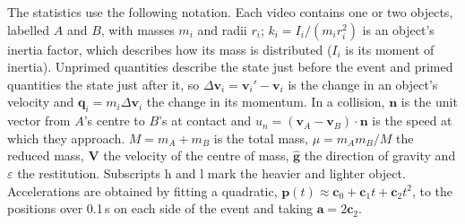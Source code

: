 \documentclass[10pt]{article}
\newcommand{\eps}{\varepsilon}
\newcommand{\ghat}{\hat{\mathbf g}}
\begin{document}
The statistics use the following notation. Each video contains one or two objects, labelled $A$ and $B$, with masses
$m_i$ and radii $r_i$; $k_i=I_i/(m_ir_i^2)$ is an object's inertia factor, which describes how its mass is distributed
($I_i$ is its moment of inertia). Unprimed quantities describe the state just before the event and primed quantities
the state just after it, so $\Delta\mathbf v_i=\mathbf v_i'-\mathbf v_i$ is the change in an object's velocity and
$\mathbf q_i=m_i\Delta\mathbf v_i$ the change in its momentum. In a collision, $\mathbf n$ is the unit vector from
$A$'s centre to $B$'s at contact and $u_n=(\mathbf v_A-\mathbf v_B)\cdot\mathbf n$ is the speed at which they
approach. $M=m_A+m_B$ is the total mass, $\mu=m_Am_B/M$ the reduced mass, $\mathbf V$ the velocity of the centre of
mass, $\ghat$ the direction of gravity and $\eps$ the restitution. Subscripts h and l mark the heavier and lighter
object. Accelerations are obtained by fitting a quadratic, $\mathbf p(t)\approx\mathbf c_0+\mathbf c_1t+\mathbf
c_2t^2$, to the positions over 0.1\,s on each side of the event and taking $\mathbf a=2\mathbf c_2$.
\end{document}

